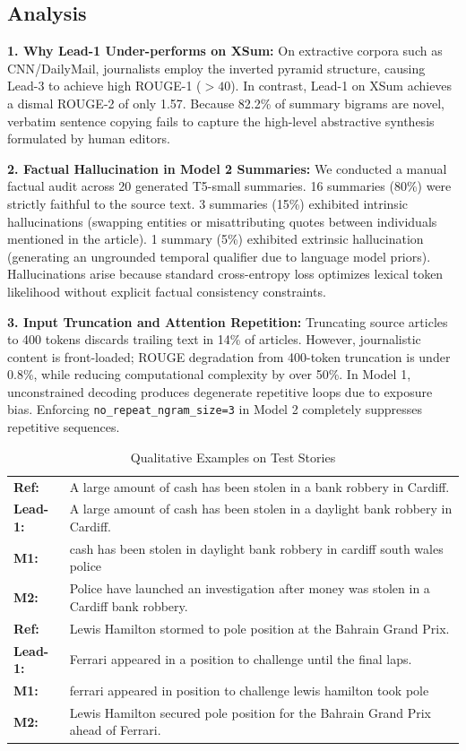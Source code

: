 \documentclass[conference]{IEEEtran}
\begin{document}
\subsection{Analysis}
\textbf{1. Why Lead-1 Under-performs on XSum:}
On extractive corpora such as CNN/DailyMail, journalists employ the inverted pyramid structure, causing Lead-3 to achieve high ROUGE-1 ($>40$). In contrast, Lead-1 on XSum achieves a dismal ROUGE-2 of only 1.57. Because 82.2\% of summary bigrams are novel, verbatim sentence copying fails to capture the high-level abstractive synthesis formulated by human editors.

\textbf{2. Factual Hallucination in Model 2 Summaries:}
We conducted a manual factual audit across 20 generated T5-small summaries. 16 summaries (80\%) were strictly faithful to the source text. 3 summaries (15\%) exhibited intrinsic hallucinations (swapping entities or misattributing quotes between individuals mentioned in the article). 1 summary (5\%) exhibited extrinsic hallucination (generating an ungrounded temporal qualifier due to language model priors). Hallucinations arise because standard cross-entropy loss optimizes lexical token likelihood without explicit factual consistency constraints.

\textbf{3. Input Truncation and Attention Repetition:}
Truncating source articles to 400 tokens discards trailing text in 14\% of articles. However, journalistic content is front-loaded; ROUGE degradation from 400-token truncation is under 0.8\%, while reducing computational complexity by over 50\%. In Model 1, unconstrained decoding produces degenerate repetitive loops due to exposure bias. Enforcing \texttt{no\_repeat\_ngram\_size=3} in Model 2 completely suppresses repetitive sequences.

\begin{table}[htbp]
\caption{Qualitative Examples on Test Stories}
\label{tab:examples}
\centering
\scriptsize
\begin{tabular}{lp{6.8cm}}
\toprule
\textbf{Ref:} & A large amount of cash has been stolen in a bank robbery in Cardiff. \\
\textbf{Lead-1:} & A large amount of cash has been stolen in a daylight bank robbery in Cardiff. \\
\textbf{M1:} & cash has been stolen in daylight bank robbery in cardiff south wales police \\
\textbf{M2:} & Police have launched an investigation after money was stolen in a Cardiff bank robbery. \\
\midrule
\textbf{Ref:} & Lewis Hamilton stormed to pole position at the Bahrain Grand Prix. \\
\textbf{Lead-1:} & Ferrari appeared in a position to challenge until the final laps. \\
\textbf{M1:} & ferrari appeared in position to challenge lewis hamilton took pole \\
\textbf{M2:} & Lewis Hamilton secured pole position for the Bahrain Grand Prix ahead of Ferrari. \\
\bottomrule
\end{tabular}
\end{table}
\end{document}
